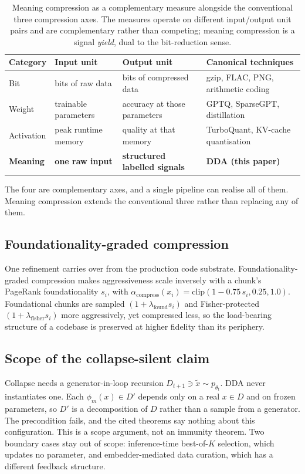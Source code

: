 \documentclass[10pt,twocolumn]{article}
\begin{document}
\begin{table}[t]
\centering
\caption{Meaning compression as a complementary measure alongside the
conventional three compression axes. The measures operate on different
input/output unit pairs and are complementary rather than competing; meaning
compression is a signal \emph{yield}, dual to the bit-reduction sense.}
\label{tab:four}
\small
\begin{tabular}{@{}llll@{}}
\toprule
\textbf{Category} & \textbf{Input unit} & \textbf{Output unit} & \textbf{Canonical techniques}\\
\midrule
Bit        & bits of raw data        & bits of compressed data       & gzip, FLAC, PNG, arithmetic coding\\
Weight     & trainable parameters    & accuracy at those parameters  & GPTQ, SparseGPT, distillation\\
Activation & peak runtime memory     & quality at that memory        & TurboQuant, KV-cache quantisation\\
\textbf{Meaning} & \textbf{one raw input} & \textbf{structured labelled signals} & \textbf{DDA (this paper)}\\
\bottomrule
\end{tabular}
\end{table}

The four are complementary axes, and a single pipeline can realise all of them.
Meaning compression extends the conventional three rather than replacing any of
them.

\subsection{Foundationality-graded compression}
One refinement carries over from the production code substrate.
Foundationality-graded compression makes aggressiveness scale inversely with a
chunk's PageRank foundationality $s_i$, with
$\alpha_{\mathrm{compress}}(x_i)=\mathrm{clip}(1-0.75\,s_i,0.25,1.0)$. Foundational
chunks are sampled $(1+\lambda_{\mathrm{found}}s_i)$ and Fisher-protected
$(1+\lambda_{\mathrm{fisher}}s_i)$ more aggressively, yet compressed less, so the
load-bearing structure of a codebase is preserved at higher fidelity than its
periphery.

\subsection{Scope of the collapse-silent claim}
\label{sec:collapse-scope}
Collapse needs a generator-in-loop recursion
$D_{t+1}\ni\tilde x\sim p_{\theta_t}$. DDA never instantiates one. Each
$\phi_m(x)\in D'$ depends only on a real $x\in D$ and on frozen parameters, so
$D'$ is a decomposition of $D$ rather than a sample from a generator. The
precondition fails, and the cited theorems say nothing about this configuration.
This is a scope argument, not an immunity theorem. Two boundary cases stay out of
scope: inference-time best-of-$K$ selection, which updates no parameter, and
embedder-mediated data curation, which has a different feedback structure.
\end{document}
